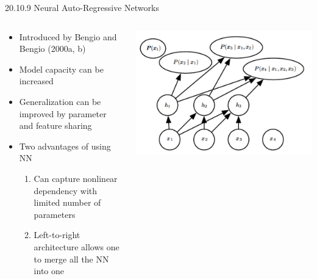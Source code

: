 \documentclass[dvipdfmx,presentation]{beamer}
\begin{document}
\begin{frame}[label={sec:orgheadline40}]{20.10.9 Neural Auto-Regressive Networks}
\begin{columns}
\begin{column}{0.60\columnwidth}
\begin{itemize}
\item Introduced by Bengio and Bengio (2000a, b)
\item Model capacity can be increased
\item Generalization can be improved by parameter and feature sharing
\item Two advantages of using NN
\begin{enumerate}
\item Can capture nonlinear dependency with limited number of parameters
\item Left-to-right architecture allows one to merge all the NN into one
\end{enumerate}
\end{itemize}
\end{column}

\begin{column}{0.40\columnwidth}
\includegraphics[width=1.1\textwidth]{./figure/dlbook_fig20_9.png}
\end{column}
\end{columns}
\end{frame}
\end{document}

